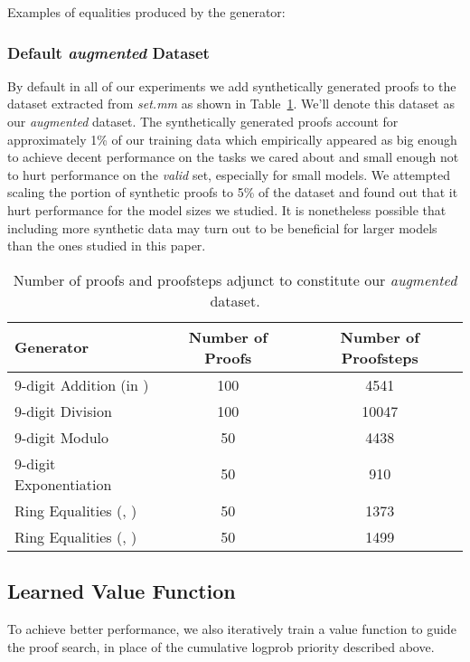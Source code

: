\documentclass{article}
\begin{document}
Examples of equalities produced by the generator:



\subsubsection{Default \textit{augmented} Dataset} 

By default in all of our experiments we add synthetically generated proofs to the dataset extracted from \textit{set.mm} as shown in Table~\ref{table:augmented}. We'll denote this dataset as our \textit{augmented} dataset. The synthetically generated proofs account for approximately 1\% of our training data which empirically appeared as big enough to achieve decent performance on the tasks we cared about and small enough not to hurt performance on the \textit{valid} set, especially for small models. We attempted scaling the portion of synthetic proofs to 5\% of the dataset and found out that it hurt performance for the model sizes we studied. It is nonetheless possible that including more synthetic data may turn out to be beneficial for larger models than the ones studied in this paper.

\begin{table}[ht]
\caption{Number of proofs and proofsteps adjunct to constitute our \textit{augmented} dataset.}
\centering
\begin{tabular}{ |l|c|c| }
    \hline
    Generator & Number of Proofs & Number of Proofsteps \\
    \hline
    9-digit Addition (in ) & 100 & 4541 \\
    9-digit Division & 100 & 10047 \\
    9-digit Modulo & 50 & 4438 \\
    9-digit Exponentiation & 50 & 910 \\
    Ring Equalities (, ) & 50 & 1373 \\
    Ring Equalities (, ) & 50 & 1499 \\
    \hline
 \end{tabular}
\label{table:augmented}
\end{table}

\subsection{Learned Value Function}
\label{section:learnedvalue}

To achieve better performance, we also iteratively train a value function to guide the proof search, in place of the cumulative logprob priority described above.
\end{document}
